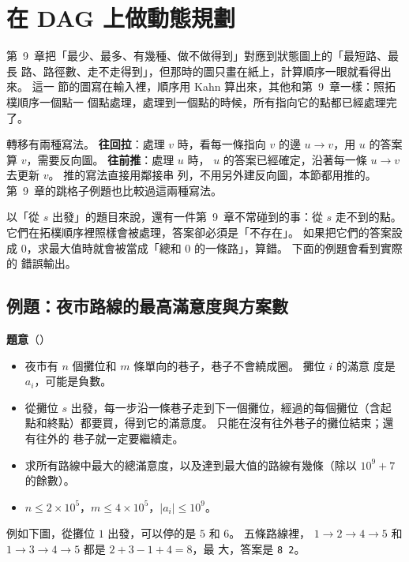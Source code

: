 \section{在 DAG 上做動態規劃}
\label{sec:dag-dp}

第~9~章把「最少、最多、有幾種、做不做得到」對應到狀態圖上的「最短路、最長
路、路徑數、走不走得到」，但那時的圖只畫在紙上，計算順序一眼就看得出來。 這一
節的圖寫在輸入裡，順序用 Kahn 算出來，其他和第~9~章一樣：照拓樸順序一個點一
個點處理，處理到一個點的時候，所有指向它的點都已經處理完了。

轉移有兩種寫法。 \textbf{往回拉}：處理 $v$ 時，看每一條指向 $v$ 的邊
$u \to v$，用 $u$ 的答案算 $v$，需要反向圖。 \textbf{往前推}：處理 $u$ 時，
$u$ 的答案已經確定，沿著每一條 $u \to v$ 去更新 $v$。 推的寫法直接用鄰接串
列，不用另外建反向圖，本節都用推的。 第~9~章的跳格子例題也比較過這兩種寫法。

以「從 $s$ 出發」的題目來說，還有一件第~9~章不常碰到的事：從 $s$ 走不到的點。
它們在拓樸順序裡照樣會被處理，答案卻必須是「不存在」。 如果把它們的答案設成
$0$，求最大值時就會被當成「總和 $0$ 的一條路」，算錯。 下面的例題會看到實際的
錯誤輸出。

\subsection{例題：夜市路線的最高滿意度與方案數}
\label{sec:ex-nightmarket}

\textbf{題意}（）

\begin{itemize}
\item 夜市有 $n$ 個攤位和 $m$ 條單向的巷子，巷子不會繞成圈。 攤位 $i$ 的滿意
度是 $a_i$，可能是負數。
\item 從攤位 $s$ 出發，每一步沿一條巷子走到下一個攤位，經過的每個攤位（含起
點和終點）都要買，得到它的滿意度。 只能在沒有往外巷子的攤位結束；還有往外的
巷子就一定要繼續走。
\item 求所有路線中最大的總滿意度，以及達到最大值的路線有幾條（除以
$10^9 + 7$ 的餘數）。
\item $n \le 2 \times 10^5$，$m \le 4 \times 10^5$，$|a_i| \le 10^9$。
\end{itemize}

例如下圖，從攤位 $1$ 出發，可以停的是 $5$ 和 $6$。 五條路線裡，
$1 \to 2 \to 4 \to 5$ 和 $1 \to 3 \to 4 \to 5$ 都是 $2 + 3 - 1 + 4 = 8$，最
大，答案是 \texttt{8 2}。

